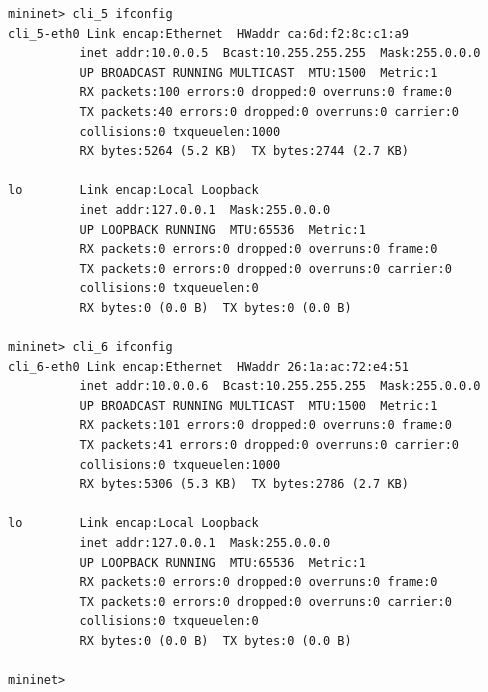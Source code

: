 \documentclass{article}
\begin{document}
\begin{Verbatim}
mininet> cli_5 ifconfig
cli_5-eth0 Link encap:Ethernet  HWaddr ca:6d:f2:8c:c1:a9
          inet addr:10.0.0.5  Bcast:10.255.255.255  Mask:255.0.0.0
          UP BROADCAST RUNNING MULTICAST  MTU:1500  Metric:1
          RX packets:100 errors:0 dropped:0 overruns:0 frame:0
          TX packets:40 errors:0 dropped:0 overruns:0 carrier:0
          collisions:0 txqueuelen:1000
          RX bytes:5264 (5.2 KB)  TX bytes:2744 (2.7 KB)

lo        Link encap:Local Loopback
          inet addr:127.0.0.1  Mask:255.0.0.0
          UP LOOPBACK RUNNING  MTU:65536  Metric:1
          RX packets:0 errors:0 dropped:0 overruns:0 frame:0
          TX packets:0 errors:0 dropped:0 overruns:0 carrier:0
          collisions:0 txqueuelen:0
          RX bytes:0 (0.0 B)  TX bytes:0 (0.0 B)

mininet> cli_6 ifconfig
cli_6-eth0 Link encap:Ethernet  HWaddr 26:1a:ac:72:e4:51
          inet addr:10.0.0.6  Bcast:10.255.255.255  Mask:255.0.0.0
          UP BROADCAST RUNNING MULTICAST  MTU:1500  Metric:1
          RX packets:101 errors:0 dropped:0 overruns:0 frame:0
          TX packets:41 errors:0 dropped:0 overruns:0 carrier:0
          collisions:0 txqueuelen:1000
          RX bytes:5306 (5.3 KB)  TX bytes:2786 (2.7 KB)

lo        Link encap:Local Loopback
          inet addr:127.0.0.1  Mask:255.0.0.0
          UP LOOPBACK RUNNING  MTU:65536  Metric:1
          RX packets:0 errors:0 dropped:0 overruns:0 frame:0
          TX packets:0 errors:0 dropped:0 overruns:0 carrier:0
          collisions:0 txqueuelen:0
          RX bytes:0 (0.0 B)  TX bytes:0 (0.0 B)

mininet>

\end{Verbatim}

\begin{thebibliography}{99}


\end{thebibliography}
\end{document}
